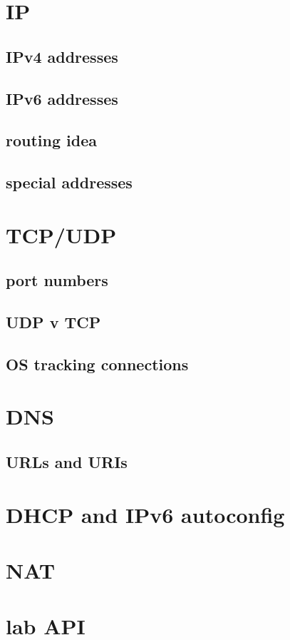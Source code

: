 \section{IP}


\subsection{IPv4 addresses}


\subsection{IPv6 addresses}


\subsection{routing idea}


\subsection{special addresses}


\section{TCP/UDP}

\subsection{port numbers}


\subsection{UDP v TCP}


\subsection{OS tracking connections}


\section{DNS}


\subsection{URLs and URIs}



\section{DHCP and IPv6 autoconfig}


\section{NAT}


\section{lab API}


